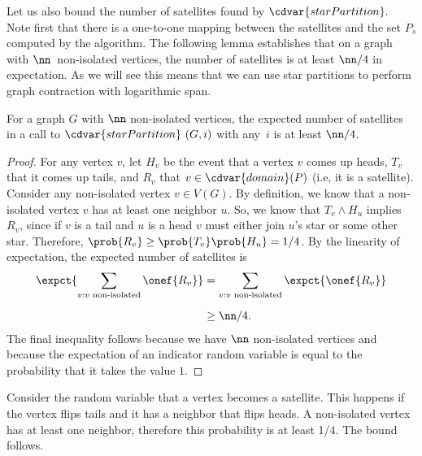 \begin{gram}
Let us also bound the number of satellites found by
$\cdvar{starPartition}.$
%
Note first that there is a one-to-one mapping between the satellites
and the set $P_s$ computed by  the algorithm.
%
%
The following lemma establishes that on a graph with
$\nn$~non-isolated vertices, the number of satellites is at least
$\nn/4$ in expectation.
%
As we will see this means that we can use star partitions to perform
graph contraction with logarithmic span.
\end{gram}

\begin{group}
\begin{lemma}
  For a graph $G$ with $\nn$ non-isolated vertices, the expected
  number of satellites in a call to $\cdvar{starPartition}~(G,i)$ with
  any~$i$ is at least $\nn/4$.
\end{lemma}

\begin{proof}
  For any vertex $v$, let $H_v$ be the event that a vertex $v$ comes
  up heads, $T_v$ that it comes up tails, and $R_v$ that $v \in
  \cdvar{domain}(P)$ (i.e, it is a satellite).
%
  Consider any non-isolated vertex $v \in V(G)$.  By definition, we
  know that a non-isolated vertex $v$ has at least one neighbor $u$.
  So, we know that $T_v \land H_u$ implies $R_v$, since if $v$ is a
  tail and $u$ is a head $v$ must either join $u$'s star or some other
  star.  Therefore, $\prob{R_v} \geq \prob{T_v} \prob{H_u} = 1/4$.  By
  the linearity of expectation,  the expected number of satellites is
  \begin{align*}
    \expct{\sum_{v: v \text{ non-isolated}} \onef{R_v}} & = \sum_{v: v
      \text{ non-isolated}} \expct{\onef{R_v}} 
\\[2mm]
  & \geq \nn/4.
  \end{align*}
  The final inequality follows because we have $\nn$ non-isolated
  vertices and because the expectation of an indicator random variable
  is equal to the probability that it takes the value $1$.
\end{proof}
\end{group}

\begin{teachnote}
Consider the random variable that a vertex becomes a satellite.  This
happens if the vertex flips tails and it has a neighbor that flips
heads.  A non-isolated vertex has at least one neighbor, therefore
this probability is at least 1/4.  The bound follows.
\end{teachnote}



